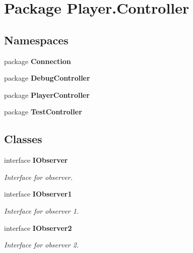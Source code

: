 \section{Package Player.\-Controller}
\label{namespace_player_1_1_controller}
\subsection*{Namespaces}
\begin{DoxyCompactItemize}
\item 
package {\bf Connection}
\item 
package {\bf Debug\-Controller}
\item 
package {\bf Player\-Controller}
\item 
package {\bf Test\-Controller}
\end{DoxyCompactItemize}
\subsection*{Classes}
\begin{DoxyCompactItemize}
\item 
interface {\bf I\-Observer}
\begin{DoxyCompactList}\small\item\em Interface for observer. \end{DoxyCompactList}\item 
interface {\bf I\-Observer1}
\begin{DoxyCompactList}\small\item\em Interface for observer 1. \end{DoxyCompactList}\item 
interface {\bf I\-Observer2}
\begin{DoxyCompactList}\small\item\em Interface for observer 2. \end{DoxyCompactList}\end{DoxyCompactItemize}
